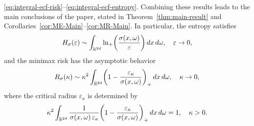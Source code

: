 \documentclass[a4paper,12pt]{article}
\let\originalleft\left
\let\originalright\right
\renewcommand{\left}{\mathopen{}\mathclose\bgroup\originalleft}
\renewcommand{\right}{\aftergroup\egroup\originalright}
\newcommand{\R}{\mathbb{R}}
\newcommand{\diff}{\mathop{}\!d}
\newcommand{\symbolnot}{\sigma}
\begin{document}
\eqref{eq:integral-ecf-risk}--\eqref{eq:integral-ecf-entropy}. Combining these results leads to the main conclusions of the paper,
stated in Theorem~\ref{thm:main-result} and Corollaries~\ref{cor:ME-Main}--\ref{cor:MR-Main}. In particular, the %
entropy satisfies
 \begin{equation}\label{eq:main-res-entropy}
    H_{\symbolnot}(\varepsilon) 
    \sim \int_{\R^{2d}} \ln_{+}\left(\frac{\symbolnot(x, \omega)}{\varepsilon}\right) \diff  x \diff \omega, 
    \quad \varepsilon \to 0,
\end{equation}
and the minimax risk has the asymptotic behavior 
\begin{equation}\label{eq:main-res-risk-1}
    R_\symbolnot (\kappa)
    \sim \kappa^2 \int_{\R^{2d}} \left(1-\frac{\varepsilon_\kappa}{\symbolnot(x, \omega)}\right)_+ \diff  x \diff \omega, 
    \quad  \kappa \to 0,
\end{equation}
where the critical radius $\varepsilon_\kappa$ is determined by 
\begin{equation}\label{eq:main-res-risk-2}
    \kappa^2 
    \int_{\R^{2d}} \frac{1}{\symbolnot(x, \omega) \, \varepsilon_\kappa }\left(1-\frac{\varepsilon_\kappa}{\symbolnot(x, \omega)}\right)_+ \diff  x \diff \omega =1, 
    \quad  \kappa >0.
\end{equation}
\end{document}
